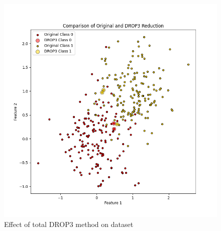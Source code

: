 \begin{enumerate}
\begin{figure}[ht]
\begin{minipage}{0.45\textwidth}
			\includegraphics[width=\textwidth]{figures/DROP3Total} %
			\caption{Effect of total DROP3 method on dataset}
			\label{fig:DROp3Total}
		\end{minipage}
	\end{figure}
	
\end{enumerate}

